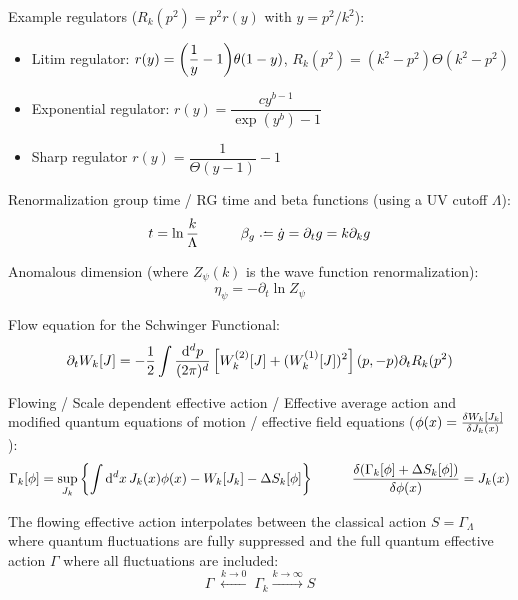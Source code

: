 			\noindent
			Example regulators ($R_k(p^2) = p^2 r(y)$ with $y=p^2/k^2$):
			\begin{itemize} \itemsep -0pt
				\item Litim regulator: $r(y) = \qty(\dfrac{1}{y}-1)\theta(1-y)$, \ie $R_k(p^2) = (k^2 - p^2) \Theta(k^2 - p^2)$
				\item Exponential regulator: $r(y) = \dfrac{cy^{b-1}}{\exp(y^b) - 1}$
				\item Sharp regulator $r(y) = \dfrac{1}{\Theta(y-1)}-1$
			\end{itemize}

			\noindent
			Renormalization group time / RG time and beta functions (using a UV cutoff $\Lambda$):
			\begin{equation}
				t = \ln \frac{k}{\Lambda}
				\hsp \beta_g \defeq \dot{g} = \partial_t g = k \partial_k g
			\end{equation}

			\noindent
			Anomalous dimension (where $Z_\psi(k)$ is the wave function renormalization):
			\begin{equation}
				\eta_\psi = -\partial_t \ln Z_\psi
			\end{equation}

			\noindent
			Flow equation for the Schwinger Functional:
			\begin{equation}
				\partial_t W_k[J] = -\frac{1}{2}\int \frac{\dd^d p}{(2\pi)^d} \, \qty[W^{(2)}_k[J]+(W_k^{(1)}[J])^2](p,-p) \partial_t R_k(p^2)
			\end{equation}

			\noindent
			Flowing / Scale dependent effective action / Effective average action and modified quantum equations of motion / effective field equations ($\phi(x)= \fdv{W_k[J_k]}{J_k(x)}$):
			\begin{equation}
				\Gamma_k[\phi] = \sup_{J_k} \qty{\int \dd^d x\, J_k(x) \phi(x) - W_k[J_k] - \Delta S_k[\phi]}
				\hsp \fdv{(\Gamma_k[\phi] + \Delta S_k[\phi])}{\phi(x)} = J_k(x)
			\end{equation}

			\noindent
			The flowing effective action interpolates between the classical action $S = \Gamma_\Lambda$ where quantum fluctuations are fully suppressed and the full quantum effective action $\Gamma$ where all fluctuations are included:
			\begin{equation}
				\Gamma \;\stackrel{k \to 0}{\longleftarrow}\; \Gamma_{k} \stackrel{k \to \infty}{\longrightarrow} S
			\end{equation}

